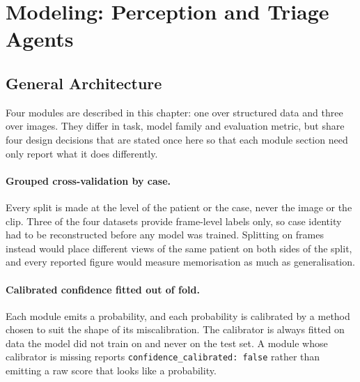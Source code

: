 %
\section{Modeling: Perception and Triage Agents}
\label{sec:perception}

\subsection{General Architecture}
\label{subsec:perception-arch}

Four modules are described in this chapter: one over structured data and three over images.
They differ in task, model family and evaluation metric, but share four design decisions that
are stated once here so that each module section need only report what it does differently.

\paragraph{Grouped cross-validation by case.} Every split is made at the level of the patient
or the case, never the image or the clip. Three of the four datasets provide frame-level labels
only, so case identity had to be reconstructed before any model was trained. Splitting on
frames instead would place different views of the same patient on both sides of the split, and
every reported figure would measure memorisation as much as generalisation.

\paragraph{Calibrated confidence fitted out of fold.} Each module emits a probability, and each
probability is calibrated by a method chosen to suit the shape of its miscalibration. The
calibrator is always fitted on data the model did not train on and never on the test set. A
module whose calibrator is missing reports \texttt{confidence\_calibrated: false} rather than
emitting a raw score that looks like a probability.

